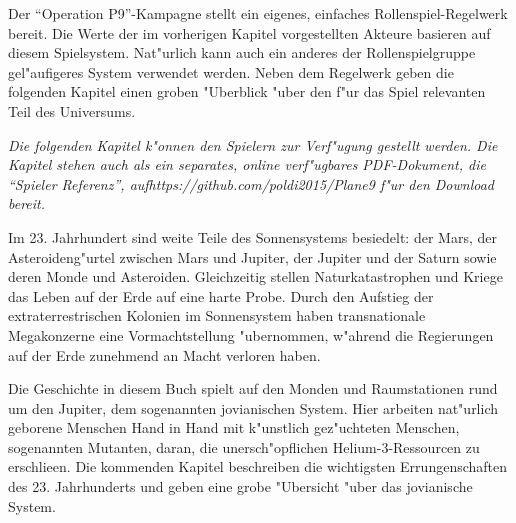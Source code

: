 
Der ``Operation P9''-Kampagne stellt ein eigenes, einfaches Rollenspiel-Regelwerk bereit. Die Werte der im vorherigen Kapitel vorgestellten Akteure basieren auf diesem Spielsystem. Nat"urlich kann auch ein anderes der Rollenspielgruppe gel"aufigeres System verwendet werden. Neben dem Regelwerk geben die folgenden Kapitel einen groben "Uberblick "uber den f"ur das Spiel relevanten Teil des Universums.

\emph{Die folgenden Kapitel k"onnen den Spielern zur Verf"ugung gestellt werden. Die Kapitel stehen auch als ein separates, online verf"ugbares PDF-Dokument, die ``Spieler Referenz'', auf\newline{}\textit{https://github.com/poldi2015/Plane9} f"ur den Download bereit.}


Im 23. Jahrhundert sind weite Teile des Sonnensystems besiedelt: der Mars, der Asteroideng"urtel zwischen Mars und Jupiter, der Jupiter und der Saturn sowie deren Monde und Asteroiden. Gleichzeitig stellen Naturkatastrophen und Kriege das Leben auf der Erde auf eine harte Probe. Durch den Aufstieg der extraterrestrischen Kolonien im Sonnensystem haben transnationale Megakonzerne eine Vormachtstellung "ubernommen, w"ahrend die Regierungen auf der Erde zunehmend an Macht verloren haben.

Die Geschichte in diesem Buch spielt auf den Monden und Raumstationen rund um den Jupiter, dem sogenannten jovianischen System. Hier arbeiten nat"urlich geborene Menschen Hand in Hand mit k"unstlich gez"uchteten Menschen, sogenannten Mutanten, daran, die unersch"opflichen Helium-3-Ressourcen zu erschlie\3en. Die kommenden Kapitel beschreiben die wichtigsten Errungenschaften des 23. Jahrhunderts und geben eine grobe "Ubersicht "uber das jovianische System.




